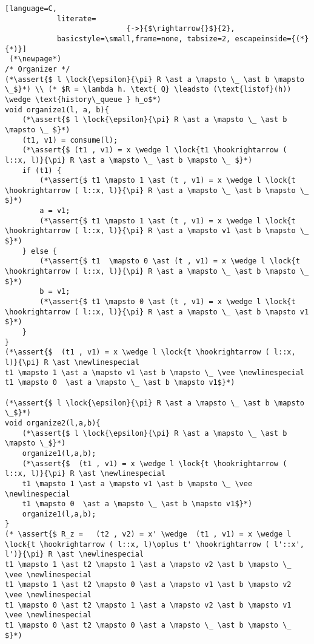 \documentclass[8pt]{article}
\newcommand{\lock}[2]{ \square \hspace{-1ex} \xrightarrow[#1]{#2}}
\newcommand{\assert}[1]{\textcolor{blue}{ \{ #1 \}  } }
\newcommand{\newlinespecial}{\newline \hphantom{100pt}}
\begin{document}
\begin{lstlisting}[language=C,
			literate=
               				{->}{$\rightarrow{}$}{2},
			basicstyle=\small,frame=none, tabsize=2, escapeinside={(*}{*)}]
 (*\newpage*)
/* Organizer */
(*\assert{$ l \lock{\epsilon}{\pi} R \ast a \mapsto \_ \ast b \mapsto \_$}*) \\ (* $R = \lambda h. \text{ Q} \leadsto (\text{listof}(h))  \wedge \text{history\_queue } h_o$*)
void organize1(l, a, b){
	(*\assert{$ l \lock{\epsilon}{\pi} R \ast a \mapsto \_ \ast b \mapsto \_ $}*)
	(t1, v1) = consume(l);
	(*\assert{$ (t1 , v1) = x \wedge l \lock{t1 \hookrightarrow ( l::x, l)}{\pi} R \ast a \mapsto \_ \ast b \mapsto \_ $}*)
	if (t1) {
		(*\assert{$ t1 \mapsto 1 \ast (t , v1) = x \wedge l \lock{t \hookrightarrow ( l::x, l)}{\pi} R \ast a \mapsto \_ \ast b \mapsto \_ $}*)
		a = v1;
		(*\assert{$ t1 \mapsto 1 \ast (t , v1) = x \wedge l \lock{t \hookrightarrow ( l::x, l)}{\pi} R \ast a \mapsto v1 \ast b \mapsto \_ $}*)
	} else {
		(*\assert{$ t1  \mapsto 0 \ast (t , v1) = x \wedge l \lock{t \hookrightarrow ( l::x, l)}{\pi} R \ast a \mapsto \_ \ast b \mapsto \_ $}*)
		b = v1;
		(*\assert{$ t1 \mapsto 0 \ast (t , v1) = x \wedge l \lock{t \hookrightarrow ( l::x, l)}{\pi} R \ast a \mapsto \_ \ast b \mapsto v1 $}*)
	}
}
(*\assert{$  (t1 , v1) = x \wedge l \lock{t \hookrightarrow ( l::x, l)}{\pi} R \ast \newlinespecial
t1 \mapsto 1 \ast a \mapsto v1 \ast b \mapsto \_ \vee \newlinespecial
t1 \mapsto 0  \ast a \mapsto \_ \ast b \mapsto v1$}*)

(*\assert{$ l \lock{\epsilon}{\pi} R \ast a \mapsto \_ \ast b \mapsto \_$}*)
void organize2(l,a,b){
	(*\assert{$ l \lock{\epsilon}{\pi} R \ast a \mapsto \_ \ast b \mapsto \_$}*)
	organize1(l,a,b);
	(*\assert{$  (t1 , v1) = x \wedge l \lock{t \hookrightarrow ( l::x, l)}{\pi} R \ast \newlinespecial
	t1 \mapsto 1 \ast a \mapsto v1 \ast b \mapsto \_ \vee \newlinespecial
	t1 \mapsto 0  \ast a \mapsto \_ \ast b \mapsto v1$}*)
	organize1(l,a,b);
}
(* \assert{$ R_z =   (t2 , v2) = x' \wedge  (t1 , v1) = x \wedge l \lock{t \hookrightarrow ( l::x, l)\oplus t' \hookrightarrow ( l'::x', l')}{\pi} R \ast \newlinespecial
t1 \mapsto 1 \ast t2 \mapsto 1 \ast a \mapsto v2 \ast b \mapsto \_ \vee \newlinespecial
t1 \mapsto 1 \ast t2 \mapsto 0 \ast a \mapsto v1 \ast b \mapsto v2 \vee \newlinespecial
t1 \mapsto 0 \ast t2 \mapsto 1 \ast a \mapsto v2 \ast b \mapsto v1 \vee \newlinespecial
t1 \mapsto 0 \ast t2 \mapsto 0 \ast a \mapsto \_ \ast b \mapsto \_ $}*)
		

\end{lstlisting}
\end{document}

